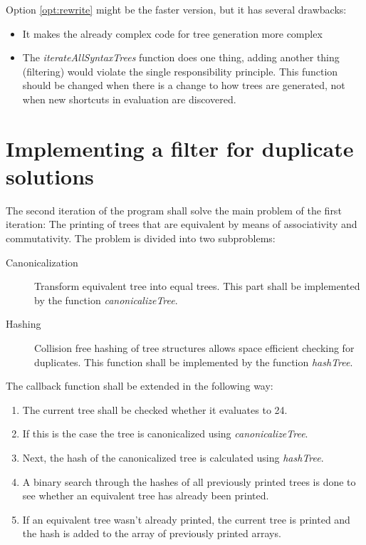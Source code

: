 \documentclass[11pt,a4paper]{article}
\newcommand{\code}[1]{\textit{#1}}
\begin{document}
Option \ref{opt:rewrite} might be the faster version, but it has
several drawbacks:
\begin{itemize}
\item It makes the already complex code for tree generation more
  complex
\item The \code{iterateAllSyntaxTrees} function does one thing,
  adding another thing (filtering) would violate the single
  responsibility principle.
  This function should be changed when there is a change to how trees
  are generated, not when new shortcuts in evaluation are discovered.
\end{itemize}



\section{Implementing a filter for duplicate solutions}

The second iteration of the program shall solve the main problem of
the first iteration:
The printing of trees that are equivalent by means of associativity
and commutativity.
The problem is divided into two subproblems:
\begin{description}
\item[Canonicalization] Transform equivalent tree into equal trees.
  This part shall be implemented by the function
  \code{canonicalizeTree}.
\item[Hashing] Collision free hashing of tree structures allows space
  efficient checking for duplicates.
  This function shall be implemented by the function
  \code{hashTree}.
\end{description}

The callback function shall be extended in the following way:
\begin{enumerate}
\item The current tree shall be checked whether it evaluates to 24.
\item If this is the case the tree is canonicalized using
  \code{canonicalizeTree}.
\item Next, the hash of the canonicalized tree is calculated using
  \code{hashTree}.
\item A binary search through the hashes of all previously printed
  trees is done to see whether an equivalent tree has already been
  printed.
\item If an equivalent tree wasn't already printed, the current tree
  is printed and the hash is added to the array of previously printed
  arrays.
\end{enumerate}
\end{document}
